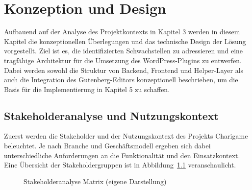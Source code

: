 \chapter{Konzeption und Design}
Aufbauend auf der Analyse des Projektkontexts in Kapitel 3 werden in diesem Kapitel die konzeptionellen Überlegungen und das technische Design der Lösung vorgestellt. Ziel ist es, die identifizierten Schwachstellen zu adressieren und eine tragfähige Architektur für die Umsetzung des WordPress-Plugins zu entwerfen. Dabei werden sowohl die Struktur von Backend, Frontend und Helper-Layer als auch die Integration des Gutenberg-Editors konzeptionell beschrieben, um die Basis für die Implementierung in Kapitel 5 zu schaffen. %
\section{Stakeholderanalyse und Nutzungskontext}
Zuerst werden die Stakeholder und der Nutzungskontext des Projekts Charigame beleuchtet.
Je nach Branche und Geschäftsmodell ergeben sich dabei unterschiedliche Anforderungen an die Funktionalität und den Einsatzkontext.
Eine Übersicht der Stakeholdergruppen ist in Abbildung~\ref{fig:stakeholder} veranschaulicht.
\begin{figure}[H]
    \centering
    
    \caption{Stakeholderanalyse Matrix (eigene Darstellung)}
    \label{fig:stakeholder}
\end{figure}

